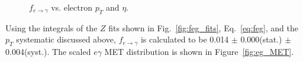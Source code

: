 \documentclass[dissertation_bw.tex]{subfiles}
\begin{document}
\begin{figure}
	\centering
	\hspace{1cm}
	\caption{$f_{e\rightarrow\gamma}$ vs. electron $p_{T}$ and $\eta$.}
	\label{fig:feg_vs_pT_eta}
\end{figure}

Using the integrals of the $Z$ fits shown in Fig.~\ref{fig:feg_fits}, Eq.~\ref{eq:feg}, and the $p_{T}$ systematic discussed above, $f_{e\rightarrow\gamma}$ is calculated to be 0.014 $\pm$ 0.000(stat.) $\pm$ 0.004(syst.).  The scaled $e\gamma$ MET distribution is shown in Figure~\ref{fig:eg_MET}.
\end{document}
